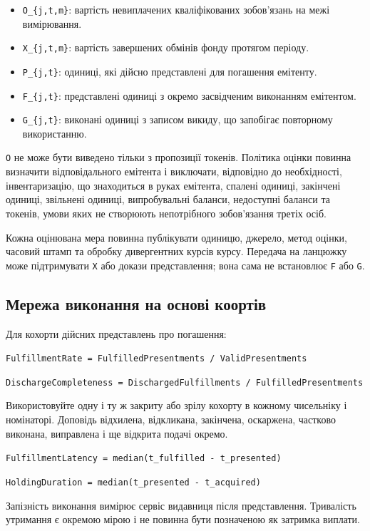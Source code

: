 \documentclass[11pt]{article}
\begin{document}
\begin{itemize}[leftmargin=*]
\item \texttt{O\_\{j,t,m\}}: вартість невиплачених кваліфікованих зобов'язань на межі вимірювання.
\item \texttt{X\_\{j,t,m\}}: вартість завершених обмінів фонду протягом періоду.
\item \texttt{P\_\{j,t\}}: одиниці, які дійсно представлені для погашення емітенту.
\item \texttt{F\_\{j,t\}}: представлені одиниці з окремо засвідченим виконанням емітентом.
\item \texttt{G\_\{j,t\}}: виконані одиниці з записом викиду, що запобігає повторному використанню.
\end{itemize}
\texttt{O} не може бути виведено тільки з пропозиції токенів. Політика оцінки повинна визначити відповідального емітента і виключати, відповідно до необхідності, інвентаризацію, що знаходиться в руках емітента, спалені одиниці, закінчені одиниці, звільнені одиниці, випробувальні баланси, недоступні баланси та токенів, умови яких не створюють непотрібного зобов'язання третіх осіб.

Кожна оцінювана мера повинна публікувати одиницю, джерело, метод оцінки, часовий штамп та обробку дивергентних курсів курсу. Передача на ланцюжку може підтримувати \texttt{X} або докази представлення; вона сама не встановлює \texttt{F} або \texttt{G}.

\subsection*{Мережа виконання на основі коортів}

Для кохорти дійсних представлень про погашення:

\texttt{FulfillmentRate = FulfilledPresentments / ValidPresentments}

\texttt{DischargeCompleteness = DischargedFulfillments / FulfilledPresentments}

Використовуйте одну і ту ж закриту або зрілу кохорту в кожному чисельніку і номінаторі. Доповідь відхилена, відкликана, закінчена, оскаржена, частково виконана, виправлена і ще відкрита подачі окремо.

\texttt{FulfillmentLatency = median(t\_fulfilled - t\_presented)}

\texttt{HoldingDuration = median(t\_presented - t\_acquired)}

Запізність виконання вимірює сервіс видавниця після представлення. Тривалість утримання є окремою мірою і не повинна бути позначеною як затримка виплати.
\end{document}
